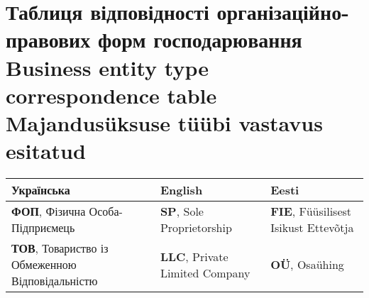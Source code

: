 %
%
%
%
%
\pagebreak
\section{Таблиця відповідності організаційно-правових форм господарювання\\Business entity type correspondence table\\Majandusüksuse tüübi vastavus esitatud}
\label{app:correspondence}
\begin{tabular}{ | l | l | l |}
  \hline
    \textbf{Українська} & \textbf{English} & \textbf{Eesti} \\
    \hline
    \textbf{ФОП}, Фізична Особа-Підприємець & \textbf{SP}, Sole Proprietorship & \textbf{FIE}, Füüsilisest Isikust Ettevõtja \\
    \textbf{ТОВ}, Товариство із Обмеженною Відповідальністю & \textbf{LLC}, Private Limited Company & \textbf{OÜ}, Osaühing \\
  \hline
\end{tabular}
